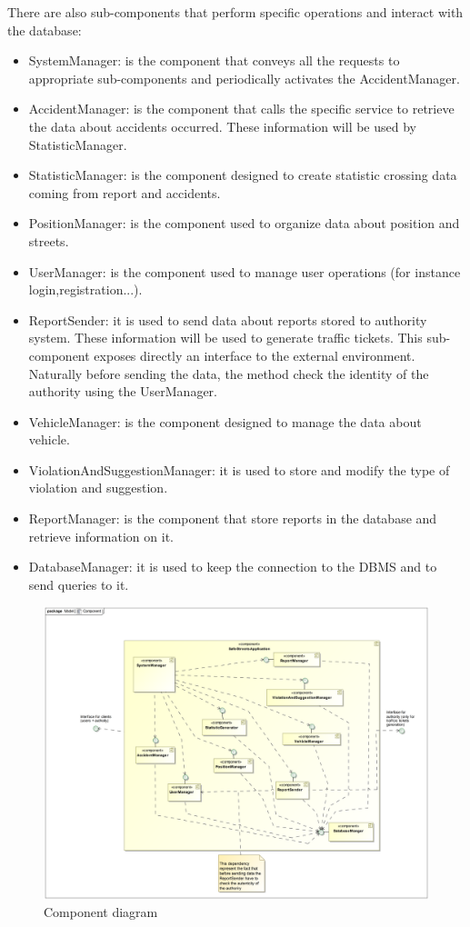 There are also sub-components that perform specific operations and interact with the database:
\begin{itemize}
 \item 
 SystemManager: is the component that conveys all the requests to appropriate sub-components and periodically activates the AccidentManager.
 \item 
 AccidentManager: is the component that calls the specific service to retrieve the data about accidents occurred. These information will be used by StatisticManager.
 \item
 StatisticManager: is the component designed to create statistic crossing data coming from report and accidents.
 \item 
 PositionManager: is the component used to organize data about position and streets.
 \item 
 UserManager: is the component used to manage user operations (for instance login,registration...).
 \item
 ReportSender: it is used to send data about reports stored to authority system. These information will be used to generate traffic tickets. This sub-component exposes directly an interface to the external environment. Naturally before sending the data, the method check the identity of the authority using the UserManager.
 \item 
 VehicleManager: is the component designed to manage the data about vehicle.
 \item 
 ViolationAndSuggestionManager: it is used to store and modify the type of violation and suggestion.
 \item 
 ReportManager: is the component that store reports in the database and retrieve information on it.
 \item 
 DatabaseManager: it is used to keep the connection to the DBMS and to send queries to it.
 
\end{itemize}

\begin{figure}[H]
	\centering
	\includegraphics[width=1.12\linewidth]{Images/component.png}
	\caption{Component diagram}
\end{figure}

